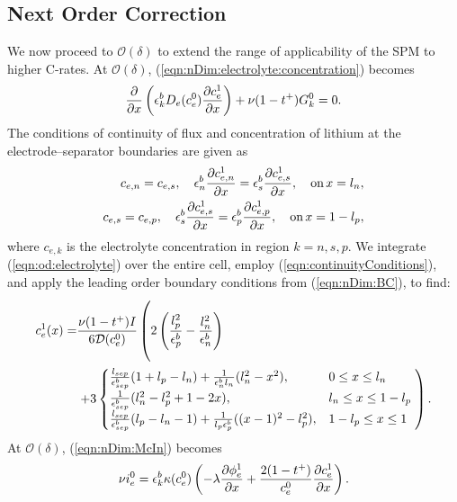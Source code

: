 \documentclass[preprint]{elsarticle}
\begin{document}
\subsection{Next Order Correction}
We now proceed to $\mathcal{O}(\delta)$ to extend the range of applicability of the SPM to higher C-rates. At $\mathcal{O}(\delta)$, (\ref{eqn:nDim:electrolyte:concentration}) becomes
\begin{equation}\label{eqn:od:electrolyte} 
    	 \pdv{x}\left(\epsilon_k^b D_e(c^0_e) \pdv{c^1_e}{x}\right) + \nu (1-t^+) G_k^0 = 0. 
\end{equation} 
The conditions of continuity of flux and concentration of lithium at the electrode--separator boundaries are given as
\begin{align}
	\begin{split}
	c_{e,n}=c_{e,s}, \quad \epsilon_n^b \pdv{c_{e,n}^1}{x} = \epsilon_s^b \pdv{c_{e,s}^1}{x}, \quad \text{on} \, x=l_n, \\
    c_{e,s}=c_{e,p}, \quad \epsilon_s^b \pdv{c_{e,s}^1}{x} = \epsilon_p^b \pdv{c_{e,p}^1}{x}, \quad \text{on} \, x=1-l_p, \label{eqn:continuityConditions}
    \end{split}
\end{align}
where $c_{e,k}$ is the electrolyte concentration in region $k=n,s,p$. We integrate (\ref{eqn:od:electrolyte}) over the entire cell, employ (\ref{eqn:continuityConditions}),  and apply the leading order boundary conditions from (\ref{eqn:nDim:BC}), to find: 
\begin{align} 
	\begin{split}\label{eqn:od:c1}
	c_e^1(x) =&\frac{\nu (1-t^+) I}{ 6 \mathcal{D}(c_e^0)}\left(\rule{0cm}{1cm} 2\left(\frac{l_p^2}{\epsilon_p^b} - \frac{l_n^2}{\epsilon_n^b}\right) \right.\\ &\left. + 3\begin{cases} 
    	  \frac{l_{sep}}{\epsilon_{sep}^b}(1+l_p-l_n) + \frac{1}{\epsilon_n^b l_n}(l_n^2-x^2) , & 0\leq x \leq l_n \\
    	  \frac{1}{\epsilon_{sep}^b}(l_n^2 - l_p^2 + 1-2x) , & l_n\leq x \leq 1-l_p \\
    	  \frac{l_{sep}}{\epsilon_{sep}^b}(l_p - l_n - 1) + \frac{1}{l_p \epsilon_p^b}( (x-1)^2 - l_p^2 ), & 1-l_p\leq x \leq 1
    \end{cases}  \rule{0cm}{1cm}\right). 
    \end{split}
\end{align} 
At $\mathcal{O}(\delta)$, (\ref{eqn:nDim:McIn}) becomes
\begin{gather} 
        \nu i_e^0 = \epsilon_k^b \kappa(c_e^0) \left( -\lambda \pdv{\phi^1_e}{x} + \frac{2(1-t^+)}{c_e^0} \pdv{c_e^1}{x} \right). \label{eqn:mcCin:order1}
\end{gather} 
\end{document}
